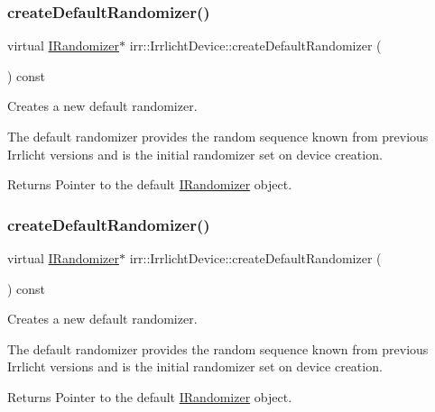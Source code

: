 \subsubsection{\texorpdfstring{create\+Default\+Randomizer()}{createDefaultRandomizer()}\hspace{0.1cm}{\footnotesize\ttfamily [2/3]}}
{\footnotesize\ttfamily virtual \hyperlink{classirr_1_1IRandomizer}{I\+Randomizer}$\ast$ irr\+::\+Irrlicht\+Device\+::create\+Default\+Randomizer (\begin{DoxyParamCaption}{ }\end{DoxyParamCaption}) const\hspace{0.3cm}{\ttfamily [pure virtual]}}



Creates a new default randomizer. 

The default randomizer provides the random sequence known from previous Irrlicht versions and is the initial randomizer set on device creation. \begin{DoxyReturn}{Returns}
Pointer to the default \hyperlink{classirr_1_1IRandomizer}{I\+Randomizer} object. 
\end{DoxyReturn}
\mbox{\label{classirr_1_1IrrlichtDevice_a267b069ea2c5f5b008fd7afa5b931ee9}} 
\subsubsection{\texorpdfstring{create\+Default\+Randomizer()}{createDefaultRandomizer()}\hspace{0.1cm}{\footnotesize\ttfamily [3/3]}}
{\footnotesize\ttfamily virtual \hyperlink{classirr_1_1IRandomizer}{I\+Randomizer}$\ast$ irr\+::\+Irrlicht\+Device\+::create\+Default\+Randomizer (\begin{DoxyParamCaption}{ }\end{DoxyParamCaption}) const\hspace{0.3cm}{\ttfamily [pure virtual]}}



Creates a new default randomizer. 

The default randomizer provides the random sequence known from previous Irrlicht versions and is the initial randomizer set on device creation. \begin{DoxyReturn}{Returns}
Pointer to the default \hyperlink{classirr_1_1IRandomizer}{I\+Randomizer} object. 
\end{DoxyReturn}
\mbox{\label{classirr_1_1IrrlichtDevice_a9dccd3d7af7cfbabee46214a89bd6650}} 
